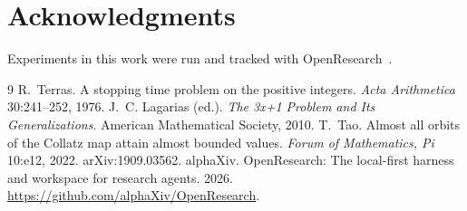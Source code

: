 \documentclass[11pt]{article}
\theoremstyle{remark}
\begin{document}
\section*{Acknowledgments}
Experiments in this work were run and tracked with OpenResearch~\citep{openresearch}.

\begin{thebibliography}{9}
 R.~Terras. A stopping time problem on the
  positive integers. \emph{Acta Arithmetica} 30:241--252, 1976.
 J.~C. Lagarias (ed.). \emph{The
  3x+1 Problem and Its Generalizations}. American Mathematical Society,
  2010.
 T.~Tao. Almost all orbits of the Collatz map
  attain almost bounded values. \emph{Forum of Mathematics, Pi} 10:e12,
  2022. arXiv:1909.03562.
 alphaXiv. OpenResearch: The
  local-first harness and workspace for research agents. 2026.
  \url{https://github.com/alphaXiv/OpenResearch}.
\end{thebibliography}
\end{document}
